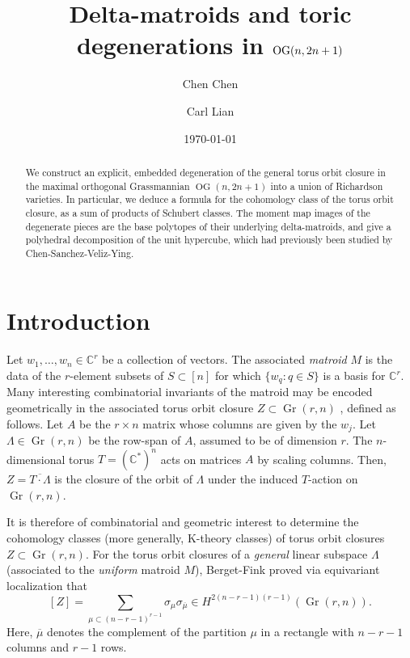 \documentclass[12pt]{amsart}
\title{Delta-matroids and toric degenerations in $\OG(n,2n+1)$}
\author{Chen Chen}
\author{Carl Lian}
\date{\today}
\DeclareMathOperator{\Gr}{Gr}
\DeclareMathOperator{\OG}{OG}
\newcommand{\bC}{\mathbb{C}}
\begin{document}
\begin{abstract}
    We construct an explicit, embedded degeneration of the general torus orbit closure in the maximal orthogonal Grassmannian $\OG(n,2n+1)$ into a union of Richardson varieties. In particular, we deduce a formula for the cohomology class of the torus orbit closure, as a sum of products of Schubert classes. The moment map images of the degenerate pieces are the base polytopes of their underlying delta-matroids, and give a polyhedral decomposition of the unit hypercube, which had previously been studied by Chen-Sanchez-Veliz-Ying.
\end{abstract}

\maketitle

\setcounter{tocdepth}{1}

\tableofcontents

\section{Introduction}

Let $w_1,\ldots,w_n\in\bC^r$ be a collection of vectors. The associated \emph{matroid} $M$ is the data of the $r$-element subsets of $S\subset [n]$ for which $\{w_q:q\in S\}$ is a basis for $\bC^r$. Many interesting combinatorial invariants of the matroid may be encoded geometrically in the associated torus orbit closure $Z\subset \Gr(r,n)$ \cite{speyer}, defined as follows. Let $A$ be the $r\times n$ matrix whose columns are given by the $w_j$. Let $\Lambda\in\Gr(r,n)$ be the row-span of $A$, assumed to be of dimension $r$. The $n$-dimensional torus $T=(\bC^{*})^n$ acts on matrices $A$ by scaling columns. Then, $Z=\overline{T\cdot \Lambda}$ is the closure of the orbit of $\Lambda$ under the induced $T$-action on $\Gr(r,n)$.

It is therefore of combinatorial and geometric interest to determine the cohomology classes (more generally, K-theory classes) of torus orbit closures $Z\subset\Gr(r,n)$. For the torus orbit closures of a \emph{general} linear subspace $\Lambda$ (associated to the \emph{uniform} matroid $M$), Berget-Fink proved via equivariant localization \cite{bf} that
\begin{equation}\label{eq:bf}
    [Z]=\sum_{\mu\subset(n-r-1)^{r-1}}\sigma_{\mu}\sigma_{\overline{\mu}}\in H^{2(n-r-1)(r-1)}(\Gr(r,n)).
\end{equation}
Here, $\overline{\mu}$ denotes the complement of the partition $\mu$ in a rectangle with $n-r-1$ columns and $r-1$ rows.
\end{document}
